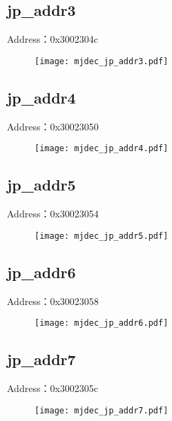 \subsection{jp\_addr3}
\label{mjdec-jp-addr3}
Address：0x3002304c
 \begin{figure}[H]
\texttt{[image: mjdec\_jp\_addr3.pdf]}
\end{figure}

\subsection{jp\_addr4}
\label{mjdec-jp-addr4}
Address：0x30023050
 \begin{figure}[H]
\texttt{[image: mjdec\_jp\_addr4.pdf]}
\end{figure}

\subsection{jp\_addr5}
\label{mjdec-jp-addr5}
Address：0x30023054
 \begin{figure}[H]
\texttt{[image: mjdec\_jp\_addr5.pdf]}
\end{figure}

\subsection{jp\_addr6}
\label{mjdec-jp-addr6}
Address：0x30023058
 \begin{figure}[H]
\texttt{[image: mjdec\_jp\_addr6.pdf]}
\end{figure}

\subsection{jp\_addr7}
\label{mjdec-jp-addr7}
Address：0x3002305c
 \begin{figure}[H]
\texttt{[image: mjdec\_jp\_addr7.pdf]}
\end{figure}

